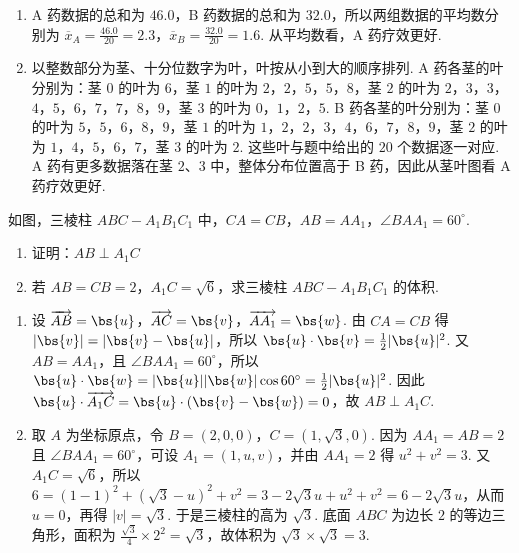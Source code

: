 \begin{solution}
\begin{enumerate}
\item A 药数据的总和为 \(46.0\)，B 药数据的总和为 \(32.0\)，所以两组数据的平均数分别为
\(\displaystyle\overline{x}_A=\frac{46.0}{20}=2.3\)，\(\displaystyle\overline{x}_B=\frac{32.0}{20}=1.6\). 从平均数看，A 药疗效更好.
\item 以整数部分为茎、十分位数字为叶，叶按从小到大的顺序排列. A 药各茎的叶分别为：茎 \(0\) 的叶为 \(6\)，茎 \(1\) 的叶为 \(2\)，\(2\)，\(5\)，\(5\)，\(8\)，茎 \(2\) 的叶为 \(2\)，\(3\)，\(3\)，\(4\)，\(5\)，\(6\)，\(7\)，\(7\)，\(8\)，\(9\)，茎 \(3\) 的叶为 \(0\)，\(1\)，\(2\)，\(5\). B 药各茎的叶分别为：茎 \(0\) 的叶为 \(5\)，\(5\)，\(6\)，\(8\)，\(9\)，茎 \(1\) 的叶为 \(1\)，\(2\)，\(2\)，\(3\)，\(4\)，\(6\)，\(7\)，\(8\)，\(9\)，茎 \(2\) 的叶为 \(1\)，\(4\)，\(5\)，\(6\)，\(7\)，茎 \(3\) 的叶为 \(2\). 这些叶与题中给出的 \(20\) 个数据逐一对应. A 药有更多数据落在茎 \(2\)、\(3\) 中，整体分布位置高于 B 药，因此从茎叶图看 A 药疗效更好.
\end{enumerate}
\end{solution}

\begin{problem}
如图，三棱柱 \(ABC - A_{1}B_{1}C_{1}\) 中，\(CA = CB\)，\(AB = AA_{1}\)，\(\angle BAA_{1} = 60^{\circ}\).

\begin{enumerate}
\item 证明：\(AB \perp A_{1}C\)
\item 若 \(AB = CB = 2\)，\(A_{1}C = \sqrt{6}\)，求三棱柱 \(ABC - A_{1}B_{1}C_{1}\) 的体积.
\end{enumerate}

\end{problem}

\begin{solution}
\begin{enumerate}
\item 设 \(\overrightarrow{AB}=\bs{u}\)，\(\overrightarrow{AC}=\bs{v}\)，\(\overrightarrow{AA_1}=\bs{w}\). 由 \(CA=CB\) 得
\(\lvert\bs{v}\rvert=\lvert\bs{v}-\bs{u}\rvert\)，所以 \(\bs{u}\cdot\bs{v}=\frac{1}{2}\lvert\bs{u}\rvert^2\). 又 \(AB=AA_1\)，且 \(\angle BAA_1=60^\circ\)，所以
\(\bs{u}\cdot\bs{w}=\lvert\bs{u}\rvert\lvert\bs{w}\rvert\cos60^\circ=\frac{1}{2}\lvert\bs{u}\rvert^2\). 因此
\(\bs{u}\cdot\overrightarrow{A_1C}=\bs{u}\cdot(\bs{v}-\bs{w})=0\)，故 \(AB\perp A_1C\).
\item 取 \(A\) 为坐标原点，令 \(B=(2,0,0)\)，\(C=(1,\sqrt{3},0)\). 因为 \(AA_1=AB=2\) 且 \(\angle BAA_1=60^\circ\)，可设 \(A_1=(1,u,v)\)，并由 \(AA_1=2\) 得 \(u^2+v^2=3\). 又 \(A_1C=\sqrt{6}\)，所以
\(\displaystyle6=(1-1)^2+(\sqrt{3}-u)^2+v^2=3-2\sqrt{3}u+u^2+v^2=6-2\sqrt{3}u\)，从而 \(u=0\)，再得 \(\lvert v\rvert=\sqrt{3}\). 于是三棱柱的高为 \(\sqrt{3}\). 底面 \(ABC\) 为边长 \(2\) 的等边三角形，面积为 \(\frac{\sqrt{3}}{4}\times2^2=\sqrt{3}\)，故体积为 \(\sqrt{3}\times\sqrt{3}=3\).
\end{enumerate}
\end{solution}

